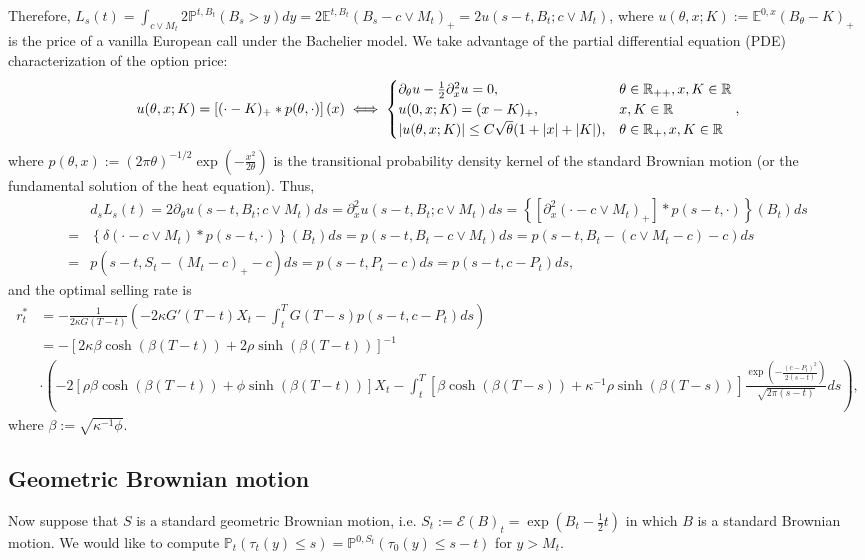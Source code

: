 \documentclass[openany,oneside]{article}
\theoremstyle{definition}
\theoremstyle{remark}
\newcommand{\E}{\mathbb{E}} %
\renewcommand{\P}{\mathbb{P}} %
\DeclarePairedDelimiter{\abs}{\lvert}{\rvert} %
\begin{document}
Therefore, $L_s(t)=\int_{c\vee M_t}2\P^{t,B_t}(B_s > y) dy=2\E^{t,B_t}(B_s-c\vee M_t)_+ = 2u(s-t,B_t; c\vee M_t)$, where $u(\theta,x;K):=\E^{0,x}(B_\theta-K)_+$ is the price of a vanilla European call under the Bachelier model. We take advantage of the partial differential equation (PDE) characterization of the option price:
\begin{align*}
u(\theta,x;K) = \left[(\cdot-K)_+ \ast p(\theta,\cdot)\right](x) \iff
\begin{cases}
\partial_\theta u - \frac{1}{2}\partial^2_x u =0, & \theta\in\mathbb{R}_{++}, x,K\in\mathbb{R} \\
u(0,x;K)=(x-K)_+, & x,K\in\mathbb{R} \\
\abs{u(\theta,x;K)} \le C\sqrt{\theta}(1+\abs{x}+\abs{K}), & \theta\in\mathbb{R}_+, x,K\in\mathbb{R}
\end{cases},
\end{align*}
where $p(\theta,x):=(2\pi\theta)^{-1/2}\exp\left(-\frac{x^2}{2\theta}\right)$ is the transitional probability density kernel of the standard Brownian motion (or the fundamental solution of the heat equation). Thus,
\begin{align*}
& d_s L_s(t) = 2\partial_\theta u(s-t,B_t;c\vee M_t) ds = \partial^2_x u(s-t,B_t;c\vee M_t) ds = \left\{\left[\partial^2_x (\cdot-c\vee M_t)_+\right]\ast p(s-t,\cdot)\right\}(B_t) ds \\
=& \left\{\delta(\cdot-c\vee M_t) \ast p(s-t,\cdot)\right\}(B_t) ds = p(s-t,B_t-c\vee M_t)ds = p(s-t,B_t-(c\vee M_t-c)-c) ds \\
=& p(s-t, S_t-(M_t-c)_+ -c) ds = p(s-t,P_t-c)ds = p(s-t,c-P_t)ds,
\end{align*}
and the optimal selling rate is
\begin{align*}
r^\ast_t &= -\frac{1}{2\kappa G(T-t)}\left(-2\kappa G'(T-t) X_t - \int_t^T G(T-s)p(s-t,c-P_t) ds\right) \\
&= -\left[2\kappa\beta\cosh(\beta (T-t))+2\rho\sinh(\beta (T-t))\right]^{-1} \\
& \cdot \left(- 2\left[\rho\beta\cosh(\beta (T-t))+\phi\sinh(\beta (T-t))\right] X_t - \int_t^T \left[\beta\cosh(\beta (T-s))+\kappa^{-1}\rho\sinh(\beta (T-s))\right] \frac{\exp{\left(-\frac{(c-P_t)^2}{2(s-t)}\right)}}{\sqrt{2\pi(s-t)}} ds \right),
\end{align*}
where $\beta:=\sqrt{\kappa^{-1}\phi}$.

\subsection{Geometric Brownian motion}
Now suppose that $S$ is a standard geometric Brownian motion, i.e. $S_t:=\mathcal{E}(B)_t = \exp\left(B_t-\frac{1}{2}t\right)$ in which $B$ is a standard Brownian motion. We would like to compute $\P_t(\tau_t(y)\le s) = \P^{0,S_t}(\tau_0(y)\le s-t)$ for $y>M_t$.
\end{document}

